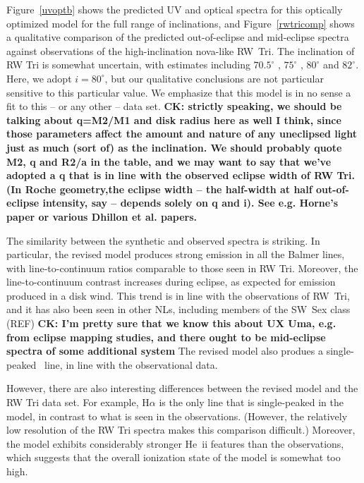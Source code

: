 \documentclass[preprint, a4paper, 11pt]{aastex}
\begin{document}
Figure~\ref{uvoptb} shows the predicted UV and optical spectra for this
optically optimized model for the full range of inclinations, and
Figure~\ref{rwtricomp} shows a qualitative comparison of the predicted
out-of-eclipse and mid-eclipse spectra against observations of the
high-inclination nova-like RW~Tri. The inclination of RW Tri is
somewhat uncertain, with estimates including $70.5^\circ$
\citep{smak1995}, $75^\circ$ \citep{groot2004}, $80^\circ$
\citep{longmore1981} and $82^\circ$\citep{frankking1981}. Here, we
adopt $i = 80^\circ$, but our qualitative conclusions are not
particular sensitive to this particular value. We emphasize that this
model is in no sense a fit to this -- or any other -- data set.
{\bf CK: strictly speaking, we should be talking about q=M2/M1 and disk
  radius here as well I think, since those parameters affect the
  amount and nature of any uneclipsed light just as much (sort of) as
  the inclination. We should probably quote M2, q and R2/a in the
  table, and we may want to say that we've adopted a q that is in line
  with the observed eclipse width of RW Tri. (In Roche geometry,the
  eclipse width -- the half-width at half out-of-eclipse intensity,
  say -- depends solely on q and i). See e.g. Horne's paper or various
  Dhillon et al. papers.}

The similarity between the synthetic and observed spectra is
striking. In particular, the revised model produces strong emission in
all the Balmer lines, with line-to-continuum ratios comparable to
those seen in RW Tri. Moreover, the line-to-continuum contrast
increases during eclipse, as expected for emission produced in a disk
wind. This trend is in line with the observations of RW~Tri, and it
has also been seen in other NLs, including members of the SW~Sex class
(REF) {\bf CK: I'm pretty sure that we know this about UX Uma, e.g. from
  eclipse mapping studies, and there ought to be mid-eclipse spectra
  of some additional system}
The revised model also produes a single-peaked \ha\ line, in line with
the observational data.

However, there are also interesting differences between the revised
model and the RW Tri data set. For example, H$\alpha$ is the only line
that is single-peaked in the model, in contrast to what is seen in the
observations. (However, the relatively low resolution of the RW Tri
spectra makes this comparison difficult.) Moreover, the model exhibits
considerably stronger He~{\sc ii} features than the observations,
which suggests that the overall ionization state of the model is
somewhat too high. 
\end{document}
